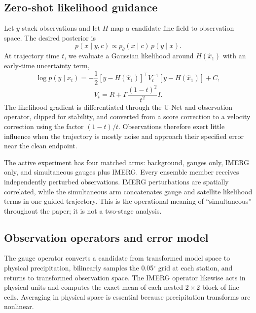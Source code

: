 \documentclass[10pt,twocolumn]{article}
\begin{document}
\subsection{Zero-shot likelihood guidance}

Let $y$ stack observations and let $H$ map a candidate fine field to observation space. The desired posterior is
\begin{equation}
 p(x\mid y,c)\propto p_\theta(x\mid c)\,p(y\mid x).
 \label{eq:posterior}
\end{equation}
At trajectory time $t$, we evaluate a Gaussian likelihood around $H(\widehat{x}_1)$ with an early-time uncertainty term,
\begin{equation}
 \log p(y\mid x_t) = -\frac{1}{2}
 \left[y-H(\widehat{x}_1)\right]^\top V_t^{-1}
 \left[y-H(\widehat{x}_1)\right]+C,
 \label{eq:likelihood}
\end{equation}
\begin{equation}
 V_t=R+\Gamma\frac{(1-t)^2}{t^2}I.
 \label{eq:vt}
\end{equation}
The likelihood gradient is differentiated through the U-Net and observation operator, clipped for stability, and converted from a score correction to a velocity correction using the factor $(1-t)/t$. Observations therefore exert little influence when the trajectory is mostly noise and approach their specified error near the clean endpoint.

The active experiment has four matched arms: background, gauges only, IMERG only, and simultaneous gauges plus IMERG. Every ensemble member receives independently perturbed observations. IMERG perturbations are spatially correlated, while the simultaneous arm concatenates gauge and satellite likelihood terms in one guided trajectory. This is the operational meaning of ``simultaneous'' throughout the paper; it is not a two-stage analysis.

\subsection{Observation operators and error model}

The gauge operator converts a candidate from transformed model space to physical precipitation, bilinearly samples the 0.05$^\circ$ grid at each station, and returns to transformed observation space. The IMERG operator likewise acts in physical units and computes the exact mean of each nested $2\times2$ block of fine cells. Averaging in physical space is essential because precipitation transforms are nonlinear.
\end{document}
